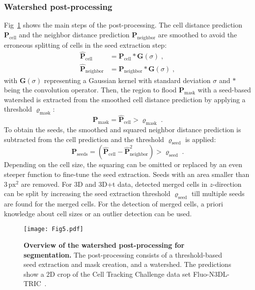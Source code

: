 \documentclass[10pt,letterpaper]{article}
\begin{document}
\subsubsection*{Watershed post-processing}
Fig~\ref{fig:post-processing} shows the main steps of the post-processing. The cell distance prediction $\mathbf{P}_{\text{cell}}$ and the neighbor distance prediction $\mathbf{P}_{\text{neighbor}}$ are smoothed to avoid the erroneous splitting of cells in the seed extraction step:
\begin{align}
	\mathbf{\hat{P}}_{\text{cell}} &= \mathbf{P}_{\text{cell}} *  \mathbf{G}\!\left(\sigma\right) \; ,\\	
	\mathbf{\hat{P}}_{\text{neighbor}} &= \mathbf{P}_{\text{neighbor}} *  \mathbf{G}\!\left(\sigma\right)\; ,
\end{align}
with $ \mathbf{G}\!\left(\sigma\right)$ representing a Gaussian kernel with standard deviation $\sigma$ and $*$ being the convolution operator. Then, the region to flood $\mathbf{P}_{\text{mask}}$ with a seed-based watershed is extracted from the smoothed cell distance prediction by applying a threshold $\varrho_{\text{mask}}$:
\begin{equation}
	\mathbf{P}_{\text{mask}} = \mathbf{\hat{P}}_{\text{cell}} > \varrho_{\text{mask}} \; .
\end{equation}To obtain the seeds, the smoothed and squared neighbor distance prediction is subtracted from the cell prediction and the threshold $\varrho_{\text{seed}}$ is applied:
\begin{equation}
	\mathbf{P}_{\text{seeds}} = \left( \mathbf{\hat{P}}_{\text{cell}} - \mathbf{\hat{P}}_{\text{neighbor}}^2 \right) > \varrho_{\text{seed}}\; .
\end{equation}Depending on the cell size, the squaring can be omitted or replaced by an even steeper function to fine-tune the seed extraction. Seeds with an area smaller than $\num{3}\,\text{px}^2$ are removed. For 3D and 3D+t data, detected merged cells in $z$-direction can be split by increasing the seed extraction threshold $\varrho_{\text{seed}}$ till multiple seeds are found for the merged cells. For the detection of merged cells, a priori knowledge about cell sizes or an outlier detection can be used.
\begin{figure}
\begin{adjustwidth}{-2.25in}{0in}
\centering
\texttt{[image: Fig5.pdf]}
\caption{\textbf{Overview of the watershed post-processing for segmentation.} The post-processing consists of a threshold-based seed extraction and mask creation, and a watershed. The predictions show a 2D crop of the Cell Tracking Challenge data set Fluo-N3DL-TRIC~\cite{Ulman2017, Maska2014}.}
\label{fig:post-processing}
\end{adjustwidth}
\end{figure}
\end{document}
